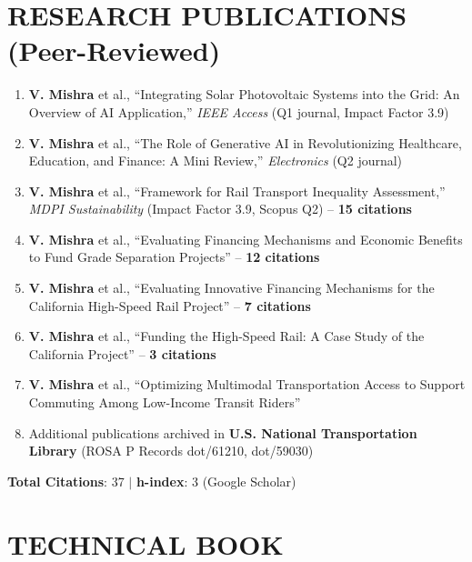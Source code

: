 \documentclass[11pt]{article}
\begin{document}
\section*{RESEARCH PUBLICATIONS (Peer-Reviewed)}

\begin{enumerate}
    \item \textbf{V. Mishra} et al., ``Integrating Solar Photovoltaic Systems into the Grid: An Overview of AI Application,'' \textit{IEEE Access} (Q1 journal, Impact Factor 3.9)
    
    \item \textbf{V. Mishra} et al., ``The Role of Generative AI in Revolutionizing Healthcare, Education, and Finance: A Mini Review,'' \textit{Electronics} (Q2 journal)
    
    \item \textbf{V. Mishra} et al., ``Framework for Rail Transport Inequality Assessment,'' \textit{MDPI Sustainability} (Impact Factor 3.9, Scopus Q2) -- \textbf{15 citations}
    
    \item \textbf{V. Mishra} et al., ``Evaluating Financing Mechanisms and Economic Benefits to Fund Grade Separation Projects'' -- \textbf{12 citations}
    
    \item \textbf{V. Mishra} et al., ``Evaluating Innovative Financing Mechanisms for the California High-Speed Rail Project'' -- \textbf{7 citations}
    
    \item \textbf{V. Mishra} et al., ``Funding the High-Speed Rail: A Case Study of the California Project'' -- \textbf{3 citations}
    
    \item \textbf{V. Mishra} et al., ``Optimizing Multimodal Transportation Access to Support Commuting Among Low-Income Transit Riders''
    
    \item Additional publications archived in \textbf{U.S. National Transportation Library} (ROSA P Records dot/61210, dot/59030)
\end{enumerate}

\textbf{Total Citations}: 37 $\mid$ \textbf{h-index}: 3 (Google Scholar)

\section*{TECHNICAL BOOK}
\end{document}
